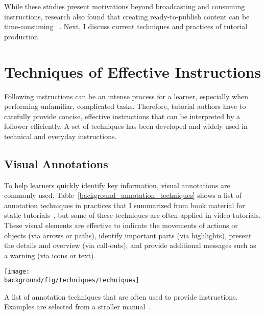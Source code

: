 While these studies present motivations beyond broadcasting and consuming instructions, research also found that creating ready-to-publish content can be time-consuming ~\cite{Kuznetsov:2010:REA:1868914.1868950}. Next, I discuss current techniques and practices of tutorial production.



\section{Techniques of Effective Instructions}
\label{background_techniques}

Following instructions can be an intense process for a learner, especially when performing unfamiliar, complicated tasks. Therefore, tutorial authors have to carefully provide concise, effective instructions that can be interpreted by a follower efficiently. A set of techniques has been developed and widely used in technical and everyday instructions.


\subsection{Visual Annotations}

To help learners quickly identify key information, visual annotations are commonly used. Table~\ref{background_annotation_techniques} shows a list of annotation techniques in practices that I summarized from book material for static tutorials~\cite{mijksenaar1999open,greenberg2012sketching,Buxton:2007:SUE:1526229,tufte1990envisioning}, but some of these techniques are often applied in video tutorials. %
%
These visual elements are effective to indicate the movements of actions or objects (via arrows or paths), identify important parts (via highlights), present the details and overview (via call-outs), and provide additional messages such as a warning (via icons or text).

\begin{table*}[!htbp]
  \centering
  \texttt{[image: \\background/fig/techniques/techniques]}
  \caption{A list of annotation techniques that are often used to provide instructions. Examples are selected from a stroller manual~\cite{MountainBuggyInstructions}.}
  \label{background_annotation_techniques}
\end{table*}

